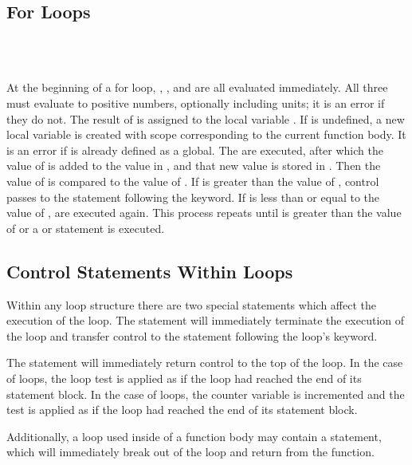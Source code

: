 \subsection{For Loops}

\begin{syntax}
 \id{}        \\
\codeindent \statements{} \\
\end{syntax}

At the beginning of a for loop, , , and  are
all evaluated immediately.  All three must evaluate to positive
numbers, optionally including units; it is an error if they do not.
The result of  is assigned to the local variable \id{}.  If
\id{} is undefined, a new local variable is created with scope
corresponding to the current function body.  It is an error if \id{}
is already defined as a global.  The \statements{} are executed, after
which the value of  is added to the value in \id{}, and that
new value is stored in \id{}.  Then the value of \id{} is compared to
the value of .  If \id{} is greater than the value of
, control passes to the statement following the 
keyword.  If \id{} is less than or equal to the value of ,
\statements{} are executed again.  This process repeats until \id{} is
greater than the value of  or a  or 
statement is executed.


\subsection{Control Statements Within Loops}

Within any loop structure there are two special statements which
affect the execution of the loop.  The  statement will
immediately terminate the execution of the loop and transfer control
to the statement following the loop's  keyword.  

The  statement will immediately return control to the top of
the loop.  In the case of  loops, the loop test is applied
as if the loop had reached the end of its statement block.  In the
case of  loops, the counter variable is incremented and the test
is applied as if the loop had reached the end of its statement block.

Additionally, a loop used inside of a function body may contain a
 statement, which will immediately break out of the loop
and return from the function.



